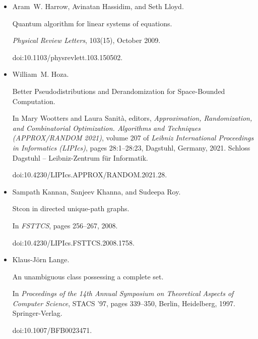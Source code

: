 \begin{itemize}
doi:10.4230/LIPIcs.ICALP.2021.73.





\item[] 
[15]

Aram W. Harrow, Avinatan Hassidim, and Seth Lloyd.


Quantum algorithm for linear systems of equations.


\emph{Physical Review Letters}, 103(15), October 2009.


doi:10.1103/physrevlett.103.150502.





\item[] 
[16]

William M. Hoza.


Better Pseudodistributions and Derandomization for Space-Bounded
Computation.


In Mary Wootters and Laura Sanità, editors, \emph{Approximation,
Randomization, and Combinatorial Optimization. Algorithms and Techniques
(APPROX/RANDOM 2021)}, volume 207 of \emph{Leibniz International Proceedings
in Informatics (LIPIcs)}, pages 28:1–28:23, Dagstuhl, Germany, 2021. Schloss
Dagstuhl – Leibniz-Zentrum für Informatik.


doi:10.4230/LIPIcs.APPROX/RANDOM.2021.28.





\item[] 
[17]

Sampath Kannan, Sanjeev Khanna, and Sudeepa Roy.


Stcon in directed unique-path graphs.


In \emph{FSTTCS}, pages 256–267, 2008.


doi:10.4230/LIPIcs.FSTTCS.2008.1758.





\item[] 
[18]

Klaus-Jörn Lange.


An unambiguous class possessing a complete set.


In \emph{Proceedings of the 14th Annual Symposium on Theoretical
Aspects of Computer Science}, STACS ’97, pages 339–350, Berlin, Heidelberg,
1997. Springer-Verlag.


doi:10.1007/BFB0023471.






\end{itemize}
